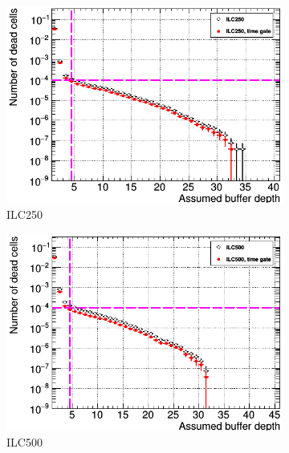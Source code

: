  \begin{figure}
 \centering
  \begin{subfigure}[t]{0.49\textwidth}
   \centering
    \includegraphics[width=\textwidth]{Figures/Pairs/Occupancy_Comparison_Layer_0_deadcells_ILC250_TimeGate.png}
   \caption{ILC250}
   \end{subfigure}
   \hfill
    \begin{subfigure}[t]{0.49\textwidth}
   \centering
    \includegraphics[width=\textwidth]{Figures/Pairs/Occupancy_Comparison_Layer_0_deadcells_ILC500_TimeGate.png}
   \caption{ILC500}
   \end{subfigure}\\
    \begin{subfigure}[t]{0.49\textwidth}
   \centering

\end{subfigure}
\end{figure}
